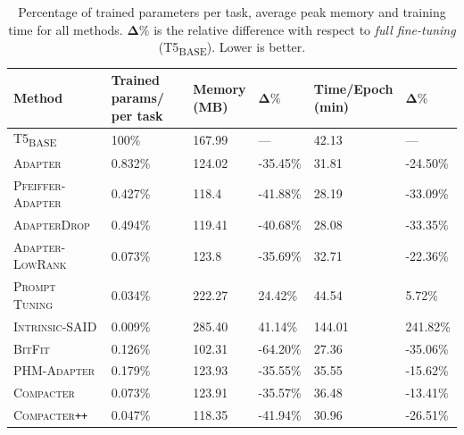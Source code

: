 \documentclass{article}
\newcommand{\basebase}{T5\textsubscript{\tiny BASE}\xspace}
\newcommand{\adapter}{\textsc{Adapter}\xspace}
\newcommand{\adapterlowrank}{\textsc{Adapter-LowRank}\xspace}
\newcommand{\adapternoclf}{\textsc{Adapter}\xspace}
\newcommand{\compacter}{\textsc{Compacter}\xspace}
\newcommand{\compacteronlyff}{\textsc{Compacter}\texttt{++}\xspace} %
\newcommand{\phmadapter}{\textsc{PHM-Adapter}\xspace}
\newcommand{\intrinsic}{\textsc{Intrinsic-SAID}\xspace}
\newcommand{\prompttuning}{\textsc{Prompt Tuning}\xspace}
\newcommand{\pfeifferadapter}{\textsc{Pfeiffer-Adapter}\xspace}
\newcommand{\pfeifferadapternoclf}{\textsc{Pfeiffer-Adapter}\xspace}
\newcommand{\adapterdrop}{\textsc{AdapterDrop}\xspace}
\newcommand{\adapterdropnoclf}{\textsc{AdapterDrop}\xspace}
\newcommand{\bitfit}{\textsc{BitFit}\xspace}
\newcommand{\bitfitnoclf}{\textsc{BitFit}\xspace}
\begin{document}
\begin{table}[tp] 
\centering
\caption{Percentage of trained parameters per task, average peak memory and training time for all methods. $\bm{\Delta \%}$ is the relative difference with respect to \emph{full fine-tuning} (\basebase). Lower is better.}
\begin{tabular}{llllll} %
    \toprule 
    \textbf{Method} &\pbox{3cm}{\textbf{Trained params/}\\ \textbf{per task\vspace{0.1em}}} &\pbox{3cm}{\textbf{Memory}\\ \textbf{(MB)\vspace{0.1em}}} & $\bm{\Delta \%}$ & \pbox{3cm}{\textbf{Time/Epoch}\\ \textbf{ (min)\vspace{0.1em}}} & $\bm{\Delta \%}$\\
    \toprule 
    \basebase &100\% &167.99  &  ---  &  42.13  &  ---\\ 
    \adapternoclf  &0.832\% &124.02  &  -35.45\%  &  31.81  &  -24.50\% \\ 
    \pfeifferadapternoclf &0.427\%&118.4  &  -41.88\%  &  28.19  &  -33.09\%\\
    \adapterdropnoclf &0.494\%&119.41  &  -40.68\%  &  28.08  &  -33.35\%\\
    \adapterlowrank & 0.073\% & 123.8  &  -35.69\%  &  32.71  &  -22.36\% \\
    \prompttuning &0.034\%& 222.27  &  24.42\%  &  44.54  &  5.72\% \\ 
    \intrinsic &0.009\%&285.40  &  41.14\%  &  144.01  &  241.82\% \\
    \bitfitnoclf &0.126\%& 102.31  &  -64.20\%  &  27.36  &  -35.06\%\\
    \midrule 
    \phmadapter &0.179\%& 123.93  &  -35.55\%  &  35.55  &  -15.62\%  \\ %
    \compacter &0.073\%& 123.91  &  -35.57\%  &  36.48  &  -13.41\% \\%
    \compacteronlyff &0.047\%&118.35  &  -41.94\%  &  30.96  &  -26.51\%\\%
    \bottomrule
    \end{tabular}
    \vspace{-0.5em}
\label{tab:performance}
\end{table}
\end{document}
